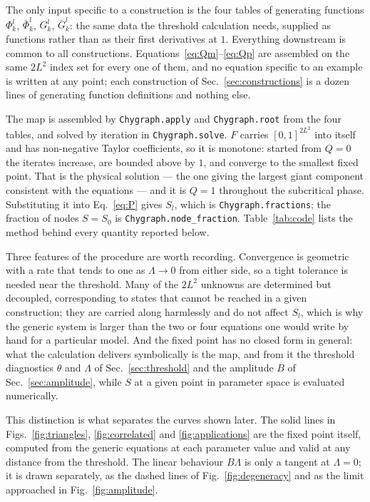 \documentclass[aps,pre,twocolumn,superscriptaddress,floatfix,longbibliography]{revtex4-2}
\newcommand{\code}[1]{\texttt{#1}}
\begin{document}
The only input specific to a construction is the four tables of generating
functions $\Phi^l_k$, $\bar\Phi^l_k$, $G^l_k$, $\bar G^l_k$: the same data the
threshold calculation needs, supplied as functions rather than as their first
derivatives at $1$. Everything downstream is common to all constructions.
Equations~\eqref{eq:Qm}--\eqref{eq:Qp} are assembled on the same $2L^2$ index
set for every one of them, and no equation specific to an example is written at
any point; each construction of Sec.~\ref{sec:constructions} is a dozen lines of
generating function definitions and nothing else.

The map is assembled by \code{Chygraph.apply} and \code{Chygraph.root} from the
four tables, and solved by iteration in \code{Chygraph.solve}. $F$ carries
$[0,1]^{2L^2}$ into itself and has
non-negative Taylor coefficients, so it is monotone: started from $Q=0$ the
iterates increase, are bounded above by $1$, and converge to the smallest fixed
point. That is the physical solution --- the one giving the largest giant
component consistent with the equations --- and it is $Q=1$ throughout the
subcritical phase. Substituting it into Eq.~\eqref{eq:P} gives $S_l$, which is
\code{Chygraph.fractions}; the fraction of nodes $S=S_0$ is
\code{Chygraph.node\_fraction}. Table~\ref{tab:code} lists the method behind
every quantity reported below.

Three features of the procedure are worth recording. Convergence is geometric
with a rate that tends to one as $\Lambda\to0$ from either side, so a tight
tolerance is needed near the threshold. Many of the $2L^2$ unknowns are
determined but decoupled, corresponding to states that cannot be reached in a
given construction; they are carried along harmlessly and do not affect $S_l$,
which is why the generic system is larger than the two or four equations one
would write by hand for a particular model. And the fixed point has no closed
form in general: what the calculation delivers symbolically is the map, and from
it the threshold diagnostics $\theta$ and $\Lambda$ of Sec.~\ref{sec:threshold}
and the amplitude $B$ of Sec.~\ref{sec:amplitude}, while $S$ at a given point in
parameter space is evaluated numerically.

This distinction is what separates the curves shown later. The solid lines in
Figs.~\ref{fig:triangles}, \ref{fig:correlated} and \ref{fig:applications} are
the fixed point itself, computed from the generic equations at each parameter
value and valid at any distance from the threshold. The linear behaviour
$B\Lambda$ is only a tangent at $\Lambda=0$; it is drawn separately, as the
dashed lines of Fig.~\ref{fig:degeneracy} and as the limit approached in
Fig.~\ref{fig:amplitude}.
\end{document}

